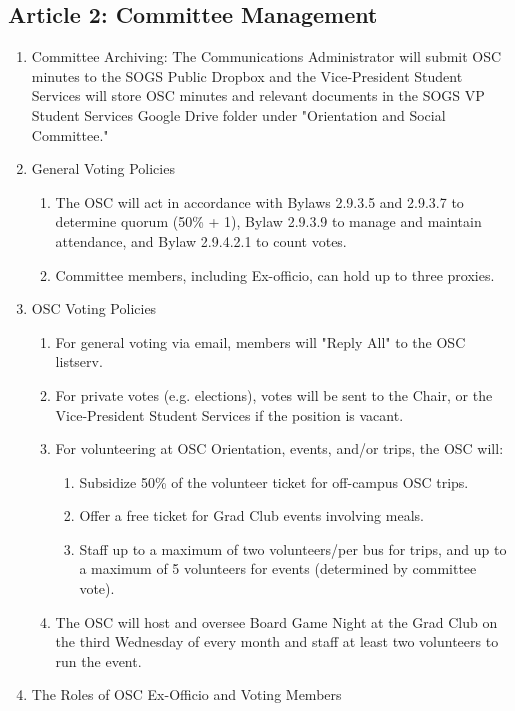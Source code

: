 \subsection{Article 2: Committee Management}
\begin{enumerate}[label*=\arabic*., align=left]	
\item Committee Archiving: The Communications Administrator will submit OSC minutes to the SOGS Public
Dropbox and the Vice-President Student Services will store OSC minutes and relevant documents in the SOGS VP Student Services Google Drive folder under "Orientation and Social Committee."
\item General Voting Policies
\begin{enumerate}[label*=\arabic*., align=left]	
\item The OSC will act in accordance with Bylaws 2.9.3.5 and 2.9.3.7 to determine quorum (50\% + 1), Bylaw 2.9.3.9 to manage and maintain attendance, and Bylaw 2.9.4.2.1 to count votes.
\item Committee members, including Ex-officio, can hold up to three proxies.
\end{enumerate}
\item OSC Voting Policies
\begin{enumerate}[label*=\arabic*., align=left]	
\item For general voting via email, members will "Reply All" to the OSC listserv.
\item For private votes (e.g. elections), votes will be sent to the Chair, or the Vice-President Student Services if the position is vacant.
\item For volunteering at OSC Orientation, events, and/or trips, the OSC will:
\begin{enumerate}
\item Subsidize 50\% of the volunteer ticket for off-campus OSC trips.
\item Offer a free ticket for Grad Club events involving meals.
\item Staff up to a maximum of two volunteers/per bus for trips, and up to a maximum of 5
volunteers for events (determined by committee vote).
\end{enumerate}
\item The OSC will host and oversee Board Game Night at the Grad Club on the third Wednesday of every month and staff at least two volunteers to run the event.
\end{enumerate}
\item The Roles of OSC Ex-Officio and Voting Members

\end{enumerate}
